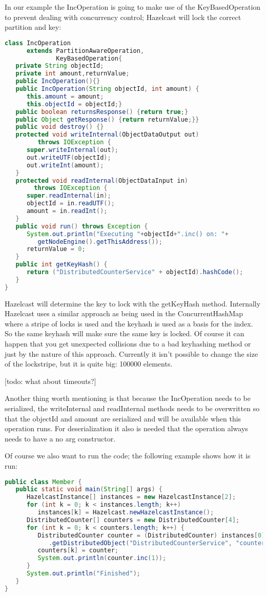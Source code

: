 In our example the IncOperation is going to make use of the KeyBasedOperation to prevent dealing with concurrency control; Hazelcast will lock the correct partition and key:
\begin{lstlisting}[language=java]
class IncOperation 
      extends PartitionAwareOperation, 
              KeyBasedOperation{
   private String objectId;
   private int amount,returnValue;
   public IncOperation(){}
   public IncOperation(String objectId, int amount) {
      this.amount = amount;
      this.objectId = objectId;}
   public boolean returnsResponse() {return true;}
   public Object getResponse() {return returnValue;}}
   public void destroy() {}
   protected void writeInternal(ObjectDataOutput out) 
         throws IOException {
      super.writeInternal(out);
      out.writeUTF(objectId);
      out.writeInt(amount);
   }
   protected void readInternal(ObjectDataInput in) 
        throws IOException {
      super.readInternal(in);
      objectId = in.readUTF();
      amount = in.readInt();
   }
   public void run() throws Exception {
      System.out.println("Executing "+objectId+".inc() on: "+
         getNodeEngine().getThisAddress());            
      returnValue = 0;
   }
   public int getKeyHash() {
      return ("DistributedCounterService" + objectId).hashCode();
   }
}	
\end{lstlisting}
Hazelcast will determine the key to lock with the getKeyHash method. Internally Hazelcast uses a similar approach as being used in the ConcurrentHashMap where a stripe of locks is used and the keyhash is used as a basis for the index. So the same keyhash will make sure the same key is locked. Of course it can happen that you get unexpected collisions due to a bad keyhashing method or just by the nature of this approach.  Currently it isn't possible to change the size of the lockstripe, but it is quite big: 100000 elements.

[todo: what about timeouts?]

Another thing worth mentioning is that because the IncOperation needs to be serialized, the writeInternal and readInternal methods needs to be overwritten so that the objectId and amount are serialized and will be available when this operation runs. For deserialization it also is needed that the operation always needs to have a no arg constructor.

Of course we also want to run the code; the following example shows how it is run:
\begin{lstlisting}[language=java]
public class Member {
   public static void main(String[] args) {
      HazelcastInstance[] instances = new HazelcastInstance[2];
      for (int k = 0; k < instances.length; k++) 
         instances[k] = Hazelcast.newHazelcastInstance();
      DistributedCounter[] counters = new DistributedCounter[4];
      for (int k = 0; k < counters.length; k++) {
         DistributedCounter counter = (DistributedCounter) instances[0]
            .getDistributedObject("DistributedCounterService", "counter" + k);
         counters[k] = counter;
         System.out.println(counter.inc(1));
      }
      System.out.println("Finished");
   }
}
\end{lstlisting}

